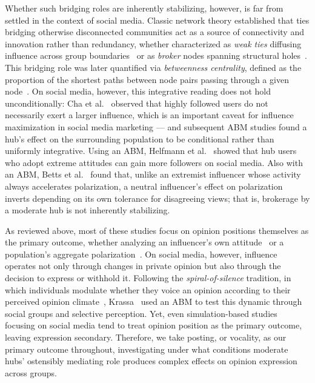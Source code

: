 \documentclass{svproc}
\begin{document}
Whether such bridging roles are inherently stabilizing, however, is
far from settled in the context of social media. Classic network
theory established that ties bridging otherwise disconnected
communities act as a source of connectivity and innovation rather than
redundancy, whether characterized as \emph{weak ties} diffusing
influence across group boundaries~\cite{granovetter1973} or as
\emph{broker} nodes spanning structural holes~\cite{burt1992}. This
bridging role was later quantified via \emph{betweenness centrality},
defined as the proportion of the shortest paths between node pairs
passing through a given node~\cite{freeman1977}. On social media,
however, this integrative reading does not hold unconditionally: Cha
et al.~\cite{cha2010} observed that highly followed users do not
necessarily exert a larger influence, which is an important caveat for
influence maximization in social media marketing --- and subsequent
ABM studies found a hub's effect on the surrounding population to be
conditional rather than uniformly integrative. Using an ABM, Helfmann
et al.~\cite{helfm2023} showed that hub users who adopt extreme
attitudes can gain more followers on social media. Also with an ABM,
Betts et al.~\cite{betts2023} found that, unlike an extremist
influencer whose activity always accelerates polarization, a neutral
influencer's effect on polarization inverts depending on its own
tolerance for disagreeing views; that is, brokerage by a moderate hub
is not inherently stabilizing.
\par


As reviewed above, most of these studies focus on opinion positions
themselves as the primary outcome, whether analyzing an influencer's
own attitude~\cite{helfm2023} or a population's aggregate
polarization~\cite{betts2023,sasahara2020}. On social media, however,
influence operates not only through changes in private opinion but
also through the decision to express or withhold it. Following the
\emph{spiral-of-silence} tradition, in which individuals modulate
whether they voice an opinion according to their perceived opinion
climate~\cite{noelle-neumann1974}, Krassa~\cite{krassa1988} used an
ABM to test this dynamic through social groups and selective
perception. Yet, even simulation-based studies focusing on social
media tend to treat opinion position as the primary outcome, leaving
expression secondary. Therefore, we take posting, or vocality, as our
primary outcome throughout, investigating under what conditions
moderate hubs' ostensibly mediating role produces complex effects on
opinion expression across groups.
\par
\end{document}
